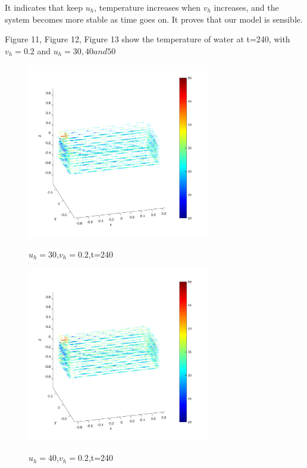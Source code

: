 \documentclass[12pt,a4paper,titlepage]{article}
\begin{document}
It indicates that keep $u_h$, temperature increases when $v_h$ increases, and the system becomes more stable as time goes on. It proves that our model is sensible.


Figure 11, Figure 12, Figure 13 show the temperature of water at t=240, with $v_h=0.2$ and $u_h=30, 40 and 50$

\begin{figure}[htb]
  \centering
  \includegraphics[width=8cm]{8-2.pdf}\\
  \caption{$u_h=30$,$v_h=0.2$,t=240}\label{8-2_p}
\end{figure}

\begin{figure}[htb]
  \centering
  \includegraphics[width=8cm]{10-2.pdf}\\
  \caption{$u_h=40$,$v_h=0.2$,t=240}\label{10-2_p}
\end{figure}
\end{document}
